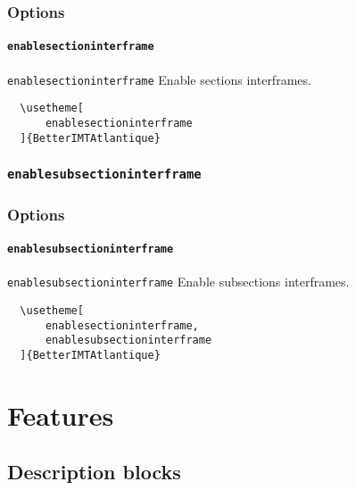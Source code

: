 \documentclass{beamer}
\begin{document}
\begin{frame}[c,fragile]
    \frametitle{Options}
    \framesubtitle{\texttt{enablesectioninterframe}}

    \begin{blueblock}{\texttt{enablesectioninterframe}}
        Enable sections interframes.
    \end{blueblock}

    \begin{example}
        \small
        \begin{verbatim}
  \usetheme[
      enablesectioninterframe
  ]{BetterIMTAtlantique}
        \end{verbatim}
    \end{example}
\end{frame}

\subsubsection{\texttt{enablesubsectioninterframe}}%
\label{ssub:enablesubsectioninterframe}

\begin{frame}[c,fragile]
    \frametitle{Options}
    \framesubtitle{\texttt{enablesubsectioninterframe}}

    \begin{blueblock}{\texttt{enablesubsectioninterframe}}
        Enable subsections interframes.
    \end{blueblock}

    \begin{example}
        \small
        \begin{verbatim}
  \usetheme[
      enablesectioninterframe,
      enablesubsectioninterframe
  ]{BetterIMTAtlantique}
        \end{verbatim}
    \end{example}
\end{frame}

\section{Features}

\subsection{Description blocks}
\end{document}
